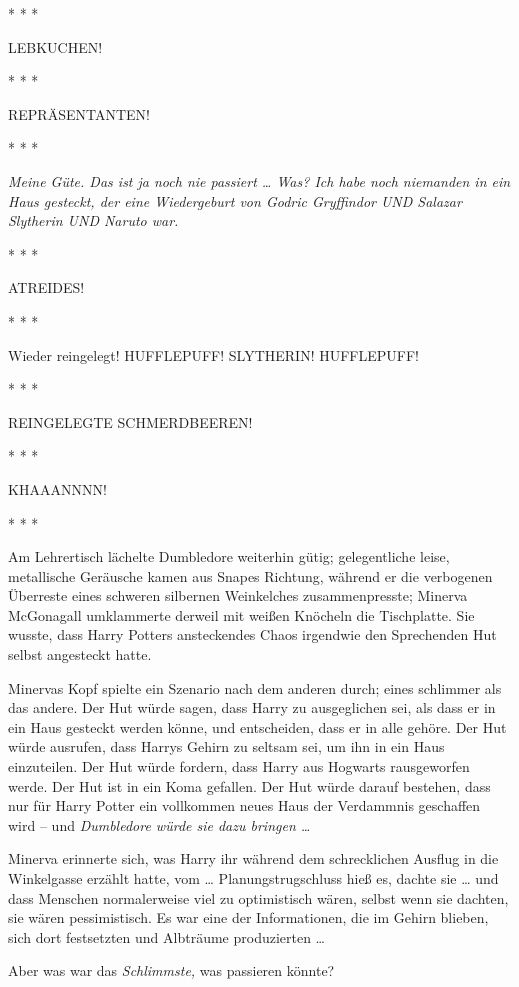 * * *

\glqq LEBKUCHEN!\grqq{}

* * *

\glqq REPRÄSENTANTEN!\grqq{}

* * *

\emph{\glqq Meine Güte. Das ist ja noch nie passiert …\grqq{}
Was? \glqq Ich habe noch niemanden in ein Haus gesteckt, der eine Wiedergeburt
von Godric Gryffindor UND Salazar Slytherin UND Naruto war.\grqq{} }

* * *

\glqq ATREIDES!\grqq{}

* * *

\glqq Wieder reingelegt! HUFFLEPUFF! SLYTHERIN! HUFFLEPUFF!\grqq{}

* * *

\glqq REINGELEGTE SCHMERDBEEREN!\grqq{}

* * *

\glqq KHAAANNNN!\grqq{}

* * *

Am Lehrertisch lächelte Dumbledore weiterhin gütig; gelegentliche leise,
metallische Geräusche kamen aus Snapes Richtung, während er die verbogenen
Überreste eines schweren silbernen Weinkelches zusammenpresste; Minerva
McGonagall umklammerte derweil mit weißen Knöcheln die Tischplatte. Sie wusste,
dass Harry Potters ansteckendes Chaos irgendwie den Sprechenden Hut selbst
angesteckt hatte.

Minervas Kopf spielte ein Szenario nach dem anderen durch; eines schlimmer als
das andere. Der Hut würde sagen, dass Harry zu ausgeglichen sei, als dass er in
ein Haus gesteckt werden könne, und entscheiden, dass er in alle gehöre. Der Hut
würde ausrufen, dass Harrys Gehirn zu seltsam sei, um ihn in ein Haus
einzuteilen. Der Hut würde fordern, dass Harry aus Hogwarts rausgeworfen werde.
Der Hut ist in ein Koma gefallen. Der Hut würde darauf bestehen, dass nur für
Harry Potter ein vollkommen neues Haus der Verdammnis geschaffen wird – und
\emph{Dumbledore würde sie dazu bringen …}

Minerva erinnerte sich, was Harry ihr während dem schrecklichen Ausflug in die
Winkelgasse erzählt hatte, vom … Planungstrugschluss hieß es, dachte sie … und
dass Menschen normalerweise viel zu optimistisch wären, selbst wenn sie dachten,
sie wären pessimistisch. Es war eine der Informationen, die im Gehirn blieben,
sich dort festsetzten und Albträume produzierten …

Aber was war das \emph{Schlimmste,} was passieren könnte?

